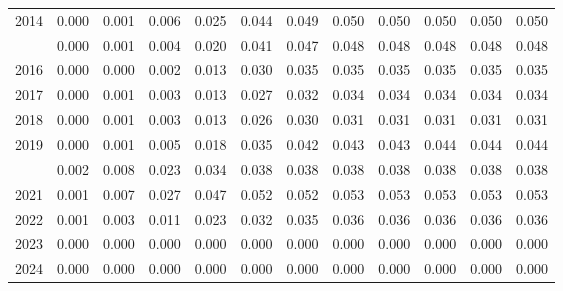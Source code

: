 \documentclass[
]{article}
\begin{document}
\begin{longtable}[t]{lrrrrrrrrrrr}
2014 & 0.000 & 0.001 & 0.006 & 0.025 & 0.044 & 0.049 & 0.050 & 0.050 & 0.050 & 0.050 & 0.050\\
\addlinespace
2015 & 0.000 & 0.001 & 0.004 & 0.020 & 0.041 & 0.047 & 0.048 & 0.048 & 0.048 & 0.048 & 0.048\\
2016 & 0.000 & 0.000 & 0.002 & 0.013 & 0.030 & 0.035 & 0.035 & 0.035 & 0.035 & 0.035 & 0.035\\
2017 & 0.000 & 0.001 & 0.003 & 0.013 & 0.027 & 0.032 & 0.034 & 0.034 & 0.034 & 0.034 & 0.034\\
2018 & 0.000 & 0.001 & 0.003 & 0.013 & 0.026 & 0.030 & 0.031 & 0.031 & 0.031 & 0.031 & 0.031\\
2019 & 0.000 & 0.001 & 0.005 & 0.018 & 0.035 & 0.042 & 0.043 & 0.043 & 0.044 & 0.044 & 0.044\\
\addlinespace
2020 & 0.002 & 0.008 & 0.023 & 0.034 & 0.038 & 0.038 & 0.038 & 0.038 & 0.038 & 0.038 & 0.038\\
2021 & 0.001 & 0.007 & 0.027 & 0.047 & 0.052 & 0.052 & 0.053 & 0.053 & 0.053 & 0.053 & 0.053\\
2022 & 0.001 & 0.003 & 0.011 & 0.023 & 0.032 & 0.035 & 0.036 & 0.036 & 0.036 & 0.036 & 0.036\\
2023 & 0.000 & 0.000 & 0.000 & 0.000 & 0.000 & 0.000 & 0.000 & 0.000 & 0.000 & 0.000 & 0.000\\
2024 & 0.000 & 0.000 & 0.000 & 0.000 & 0.000 & 0.000 & 0.000 & 0.000 & 0.000 & 0.000 & 0.000\\*
\end{longtable}
\end{document}
